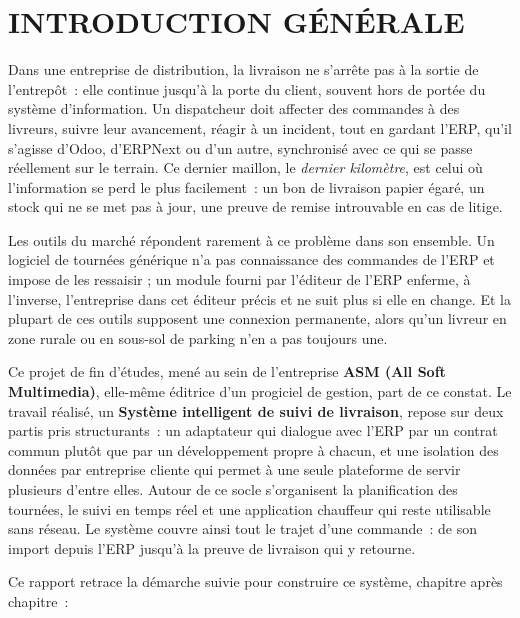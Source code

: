 \chapter*{INTRODUCTION GÉNÉRALE}

Dans une entreprise de distribution, la livraison ne s'arrête pas à la sortie de l'entrepôt~: elle
continue jusqu'à la porte du client, souvent hors de portée du système d'information. Un dispatcheur
doit affecter des commandes à des livreurs, suivre leur avancement, réagir à un incident, tout en
gardant l'ERP, qu'il s'agisse d'Odoo, d'ERPNext ou d'un autre, synchronisé avec ce qui se passe réellement sur le
terrain. Ce dernier maillon, le \emph{dernier kilomètre}, est celui où l'information se perd le
plus facilement~: un bon de livraison papier égaré, un stock qui ne se met pas à jour, une preuve de
remise introuvable en cas de litige.

Les outils du marché répondent rarement à ce problème dans son ensemble. Un logiciel de tournées
générique n'a pas connaissance des commandes de l'ERP et impose de les ressaisir ; un module fourni
par l'éditeur de l'ERP enferme, à l'inverse, l'entreprise dans cet éditeur précis et ne suit plus si
elle en change. Et la plupart de ces outils supposent une connexion permanente, alors qu'un livreur
en zone rurale ou en sous-sol de parking n'en a pas toujours une.

Ce projet de fin d'études, mené au sein de l'entreprise \textbf{ASM (All Soft Multimedia)},
elle-même éditrice d'un progiciel de gestion, part de ce constat. Le travail réalisé, un
\textbf{Système intelligent de suivi de livraison}, repose sur deux partis pris structurants~: un
adaptateur qui dialogue avec l'ERP par un contrat commun plutôt que par un développement propre à
chacun, et une isolation des données par entreprise cliente qui permet à une seule plateforme de
servir plusieurs d'entre elles. Autour de ce socle s'organisent la planification des tournées, le
suivi en temps réel et une application chauffeur qui reste utilisable sans réseau. Le système
couvre ainsi tout le trajet d'une commande~: de son import depuis l'ERP jusqu'à la preuve de
livraison qui y retourne.

Ce rapport retrace la démarche suivie pour construire ce système, chapitre après chapitre~:

